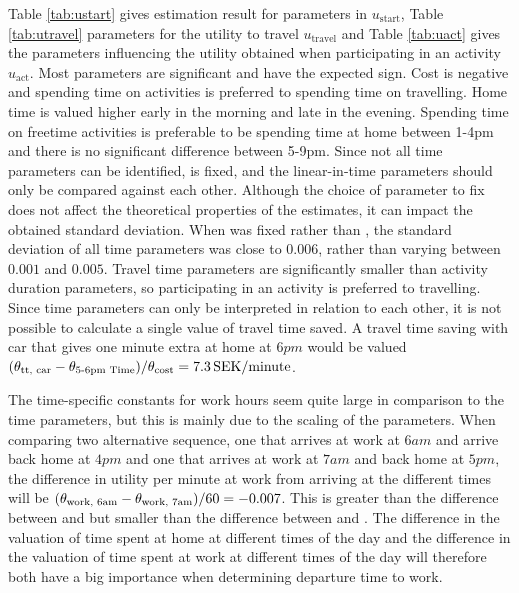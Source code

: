 Table \ref{tab:ustart} gives estimation result for parameters in $u_\text{start}$, Table \ref{tab:utravel} parameters for the utility to travel $u_\text{travel}$ and  Table \ref{tab:uact} gives the parameters influencing the utility obtained when participating in an activity $u_\text{act}$. Most parameters are significant and have the expected sign. Cost is negative and spending time on activities is preferred to spending time on travelling. Home time is valued higher early in the morning and late in the evening. Spending time on freetime activities is preferable to be spending time at home between 1-4pm and there is no significant difference between 5-9pm. Since not all time parameters can be identified,  is fixed, and the linear-in-time parameters should only be compared against each other. Although the choice of parameter to fix does not affect the theoretical properties of the estimates, it can impact the obtained standard deviation. When  was fixed rather than , the standard deviation of all time parameters was close to $0.006$, rather than varying between $0.001$ and $0.005$. Travel time parameters are significantly smaller than activity duration parameters, so participating in an activity is preferred to travelling. Since time parameters can only be interpreted in relation to each other, it is not possible to calculate a single value of travel time saved. A travel time saving with car that gives one minute extra at home at $6\unit{pm}$ would be valued $({\theta_{\text{tt, car}}} - {\theta_{\text{5-6pm Time}}})/{\theta_{\text{cost}}} = 7.3\, \mathrm{SEK/minute}$.

The time-specific constants for work hours seem quite large in comparison to the time parameters, but this is mainly due to the scaling of the parameters. When comparing two alternative sequence, one that arrives at work at $6\unit{am}$ and arrive back home at $4\unit{pm}$ and one that arrives at work at $7\unit{am}$ and back home at $5\unit{pm}$, the difference in utility per minute at work from arriving at the different times will be $({\theta_{\text{work, 6am}}}-{\theta_{\text{work, 7am}}})/60 = -0.007$. This is greater than the difference between  and  but smaller than the difference between  and . The difference in the valuation of time spent at home at different times of the day and the difference in the valuation of time spent at work at different times of the day will therefore both have a big importance when determining departure time to work.

